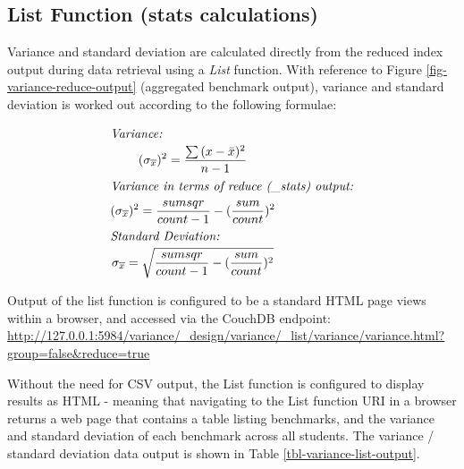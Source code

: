 \subsection{List Function (stats calculations)}
Variance and standard deviation are calculated directly from the reduced index output during data retrieval using a \textit{List} function. With reference to Figure \ref{fig-variance-reduce-output} (aggregated benchmark output), variance and standard deviation is worked out according to the following formulae: \begin{spreadlines}{15pt}
  \begin{gather*}
    \intertext{\textit{Variance:}}
    (\sigma_{\overline{x}})^{2} = \frac{\sum{(x-\bar{x})^2}}{n-1}\\
    \intertext{\textit{Variance in terms of reduce (\_stats) output:}}
    (\sigma_{\overline{x}})^{2} = \frac{sumsqr}{count-1} - (\frac{sum}{count})^{2}\\
    \intertext{\textit{Standard Deviation:}}
    \sigma_{\overline{x}} = \sqrt{\frac{sumsqr}{count-1} - (\frac{sum}{count})^{2}}
  \end{gather*}
\end{spreadlines}

Output of the list function is configured to be a standard HTML page views within a browser, and accessed via the CouchDB endpoint: \url{http://127.0.0.1:5984/variance/_design/variance/_list/variance/variance.html?group=false&reduce=true}

Without the need for CSV output, the List function is configured to display results as HTML - meaning that navigating to the List function URI in a browser returns a web page that contains a table listing benchmarks, and the variance and standard deviation of each benchmark across all students. The variance / standard deviation data output is shown in Table \ref{tbl-variance-list-output}.

